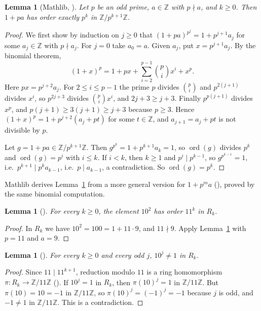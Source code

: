 \documentclass[11pt]{amsart}
\theoremstyle{plain}
\newtheorem{lemma}[theorem]{Lemma}
\theoremstyle{definition}
\newcommand{\Z}{\mathbb{Z}}
\newcommand{\ord}{\operatorname{ord}}
\begin{document}
\begin{lemma}[Mathlib, ]\label{lem:lift}
Let $p$ be an odd prime, $a\in\Z$ with $p\nmid a$, and $k\ge0$. Then $1+pa$ has order exactly $p^k$ in $\Z/p^{k+1}\Z$.
\end{lemma}

\begin{proof}
We first show by induction on $j\ge0$ that $(1+pa)^{p^j}=1+p^{j+1}a_j$ for some $a_j\in\Z$ with $p\nmid a_j$. For $j=0$ take $a_0=a$. Given $a_j$, put $x=p^{j+1}a_j$. By the binomial theorem,
\[
  (1+x)^p = 1 + px + \sum_{i=2}^{p-1}\binom{p}{i}x^i + x^p .
\]
Here $px=p^{j+2}a_j$. For $2\le i\le p-1$ the prime $p$ divides $\binom pi$ and $p^{2(j+1)}$ divides $x^i$, so $p^{2j+3}$ divides $\binom pi x^i$, and $2j+3\ge j+3$. Finally $p^{p(j+1)}$ divides $x^p$, and $p(j+1)\ge3(j+1)\ge j+3$ because $p\ge3$. Hence $(1+x)^p=1+p^{j+2}(a_j+pt)$ for some $t\in\Z$, and $a_{j+1}=a_j+pt$ is not divisible by $p$.

Let $g=1+pa\in\Z/p^{k+1}\Z$. Then $g^{p^k}=1+p^{k+1}a_k=1$, so $\ord(g)$ divides $p^k$ and $\ord(g)=p^i$ with $i\le k$. If $i<k$, then $k\ge1$ and $p^i\mid p^{k-1}$, so $g^{p^{k-1}}=1$, i.e.\ $p^{k+1}\mid p^ka_{k-1}$, i.e.\ $p\mid a_{k-1}$, a contradiction. So $\ord(g)=p^k$.
\end{proof}

Mathlib derives Lemma~\ref{lem:lift} from a more general version for $1+p^ma$ (), proved by the same binomial computation.

\begin{lemma}[]\label{lem:hundred}
For every $k\ge0$, the element $10^2$ has order $11^k$ in $R_k$.
\end{lemma}

\begin{proof}
In $R_k$ we have $10^2=100=1+11\cdot 9$, and $11\nmid 9$. Apply Lemma~\ref{lem:lift} with $p=11$ and $a=9$.
\end{proof}

\begin{lemma}[]\label{lem:odd}
For every $k\ge0$ and every odd $j$, $10^j\ne1$ in $R_k$.
\end{lemma}

\begin{proof}
Since $11\mid 11^{k+1}$, reduction modulo $11$ is a ring homomorphism $\pi\colon R_k\to\Z/11\Z$ (). If $10^j=1$ in $R_k$, then $\pi(10)^j=1$ in $\Z/11\Z$. But $\pi(10)=10=-1$ in $\Z/11\Z$, so $\pi(10)^j=(-1)^j=-1$ because $j$ is odd, and $-1\ne1$ in $\Z/11\Z$. This is a contradiction.
\end{proof}
\end{document}
